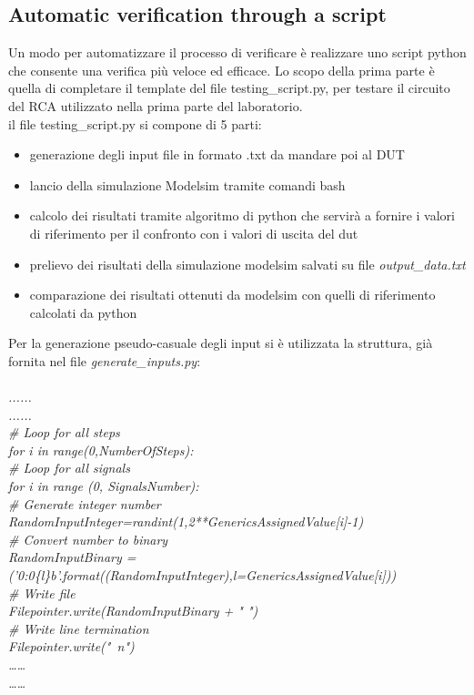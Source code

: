 \subsection{Automatic verification through a script}
Un modo per automatizzare il processo di verificare è realizzare uno script python che consente una verifica più veloce ed efficace. Lo scopo della prima parte è quella di completare il template del file testing\_script.py, per testare il circuito del RCA utilizzato nella prima parte del laboratorio.\\
il file testing\_script.py  si compone di 5 parti:
\begin{itemize}
	\item{generazione degli input file in formato .txt da mandare poi al DUT}
	\item{lancio della simulazione Modelsim tramite comandi bash}
	\item{calcolo dei risultati tramite algoritmo di python che servirà a fornire i valori di riferimento per il confronto con i valori  di uscita del dut}
	\item{prelievo dei risultati della simulazione modelsim salvati su file \textit{output\_data.txt}}
	\item{comparazione dei risultati ottenuti da modelsim con quelli di riferimento calcolati da python}
\end{itemize}
Per la generazione pseudo-casuale degli input si è utilizzata la struttura, già fornita nel file \textit{generate\_inputs.py}:\\
\\
\textit{......\\
......\\
\# Loop for all steps\\
for i in range(0,NumberOfSteps):\\
\hspace*{1cm}\# Loop for all signals\\
\hspace*{1cm}for i in range (0, SignalsNumber):\\
\hspace*{2cm}\# Generate integer number\\
\hspace*{2cm}RandomInputInteger=randint(1,2**GenericsAssignedValue[i]-1)\\
\hspace*{2cm}\# Convert number to binary\\
\hspace*{2cm}RandomInputBinary = ('{0:0\{l\}b}'.format((RandomInputInteger),l=GenericsAssignedValue[i]))\\
\hspace*{2cm}\# Write file\\
\hspace*{2cm}Filepointer.write(RandomInputBinary + " ")\\
\hspace*{2cm}\# Write line termination\\
\hspace*{2cm}Filepointer.write("\ n")\\
……\\
……}\\
